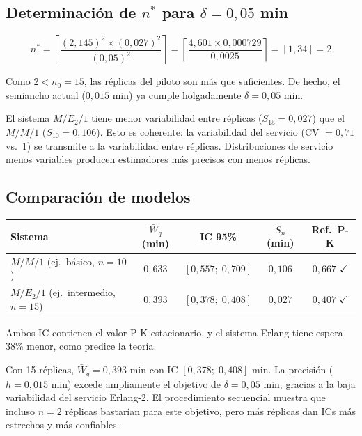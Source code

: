 \documentclass[11pt, letterpaper]{article}
\begin{document}
\subsection{Determinación de $n^*$ para $\delta = 0{,}05$ min}

\[
n^* = \left\lceil\frac{(2{,}145)^2 \times (0{,}027)^2}{(0{,}05)^2}\right\rceil = \left\lceil\frac{4{,}601 \times 0{,}000729}{0{,}0025}\right\rceil = \left\lceil 1{,}34 \right\rceil = 2
\]

Como $2 < n_0 = 15$, las réplicas del piloto son más que suficientes. De hecho, el semiancho actual ($0{,}015$ min) ya cumple holgadamente $\delta = 0{,}05$ min.

\begin{notabox}
El sistema $M/E_2/1$ tiene menor variabilidad entre réplicas ($S_{15}=0{,}027$) que el $M/M/1$ ($S_{10}=0{,}106$). Esto es coherente: la variabilidad del servicio (CV $= 0{,}71$ vs.\ $1$) se transmite a la variabilidad entre réplicas. Distribuciones de servicio menos variables producen estimadores más precisos con menos réplicas.
\end{notabox}

\subsection{Comparación de modelos}

\begin{center}\small
\renewcommand{\arraystretch}{1.3}
\begin{tabular}{lcccc}
\toprule
\textbf{Sistema} & $\bar W_q$ (min) & IC 95\% & $S_n$ (min) & Ref.\ P-K \\
\midrule
$M/M/1$ (ej.\ básico, $n=10$)  & $0{,}633$ & $[0{,}557;\;0{,}709]$ & $0{,}106$ & $0{,}667$ $\checkmark$ \\
$M/E_2/1$ (ej.\ intermedio, $n=15$) & $0{,}393$ & $[0{,}378;\;0{,}408]$ & $0{,}027$ & $0{,}407$ $\checkmark$ \\
\bottomrule
\end{tabular}
\end{center}

Ambos IC contienen el valor P-K estacionario, y el sistema Erlang tiene espera 38\% menor, como predice la teoría.

\begin{resultadobox}
Con 15 réplicas, $\bar W_q = 0{,}393$ min con IC $[0{,}378;\; 0{,}408]$ min. La precisión ($h=0{,}015$ min) excede ampliamente el objetivo de $\delta=0{,}05$ min, gracias a la baja variabilidad del servicio Erlang-2. El procedimiento secuencial muestra que incluso $n=2$ réplicas bastarían para este objetivo, pero más réplicas dan ICs más estrechos y más confiables.
\end{resultadobox}
\end{document}
